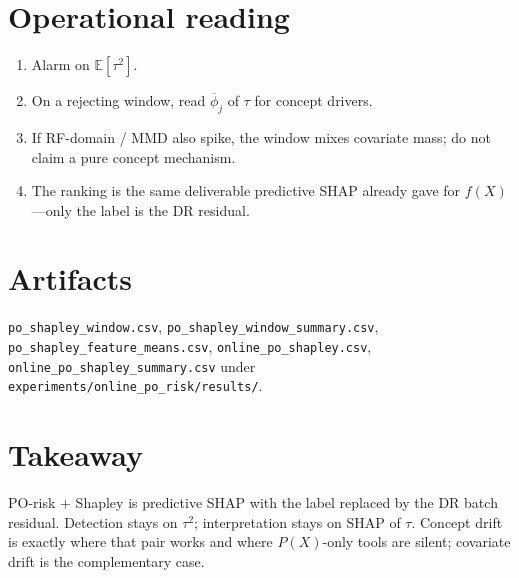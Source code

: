 \documentclass[11pt]{article}
\begin{document}
\section{Operational reading}

\begin{enumerate}
\item Alarm on $\mathbb{E}[\tau^2]$.
\item On a rejecting window, read $\overline{\phi}_j$ of $\tau$ for
  concept drivers.
\item If RF-domain / MMD also spike, the window mixes covariate mass;
  do not claim a pure concept mechanism.
\item The ranking is the same deliverable predictive SHAP already
  gave for $f(X)$---only the label is the DR residual.
\end{enumerate}

\section*{Artifacts}
\texttt{po\_shapley\_window.csv},
\texttt{po\_shapley\_window\_summary.csv},
\texttt{po\_shapley\_feature\_means.csv},
\texttt{online\_po\_shapley.csv},
\texttt{online\_po\_shapley\_summary.csv}
under \texttt{experiments/online\_po\_risk/results/}.

\section*{Takeaway}
PO-risk $+$ Shapley is predictive SHAP with the label replaced by the
DR batch residual. Detection stays on $\tau^2$; interpretation stays
on SHAP of $\tau$. Concept drift is exactly where that pair works and
where $P(X)$-only tools are silent; covariate drift is the complementary
case.
\end{document}
